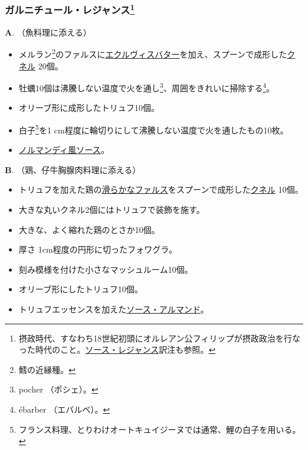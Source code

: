 \begin{recette}
\atoaki{}

\hypertarget{garniture-regence}{%
\subsubsection[ガルニチュール・レジャンス]{\texorpdfstring{ガルニチュール・レジャンス\footnote{摂政時代、すなわち18世紀初頭にオルレアン公フィリップが摂政政治を行なった時代のこと。\protect\hyperlink{sauce-regence}{ソース・レジャンス}訳注も参照。}}{ガルニチュール・レジャンス}}\label{garniture-regence}}



\textbf{A}. （魚料理に添える）

\begin{itemize}
\item
  メルラン\footnote{鱈の近縁種。}のファルスに\protect\hyperlink{beurre-d-ecrevisse}{エクルヴィスバター}を加え、スプーンで成形した\protect\hyperlink{quenelles-diverses}{クネル}
  20個。
\item
  牡蠣10個は沸騰しない温度で火を通し\footnote{pocher （ポシェ）。}、周囲をきれいに掃除する\footnote{ébarber
    （エバルベ）。}。
\item
  オリーブ形に成形したトリュフ10個。
\item
  白子\footnote{フランス料理、とりわけオートキュイジーヌでは通常、鯉の白子を用いる。}を1
  cm程度に輪切りにして沸騰しない温度で火を通したもの10枚。
\item
  \protect\hyperlink{sauce-normande}{ノルマンディ風ソース}。
\end{itemize}

\textbf{B}. （鶏、仔牛胸腺肉料理に添える）

\begin{itemize}
\item
  トリュフを加えた鶏の\protect\hyperlink{farce-b}{滑らかなファルス}をスプーンで成形した\protect\hyperlink{quenelles-diverses}{クネル}
  10個。
\item
  大きな丸いクネル2個にはトリュフで装飾を施す。
\item
  大きな、よく縮れた鶏のとさか10個。
\item
  厚さ 1cm程度の円形に切ったフォワグラ。
\item
  刻み模様を付けた小さなマッシュルーム10個。
\item
  オリーブ形にしたトリュフ10個。
\item
  トリュフエッセンスを加えた\protect\hyperlink{sauce-allemande}{ソース・アルマンド}。
\end{itemize}


\end{recette}
